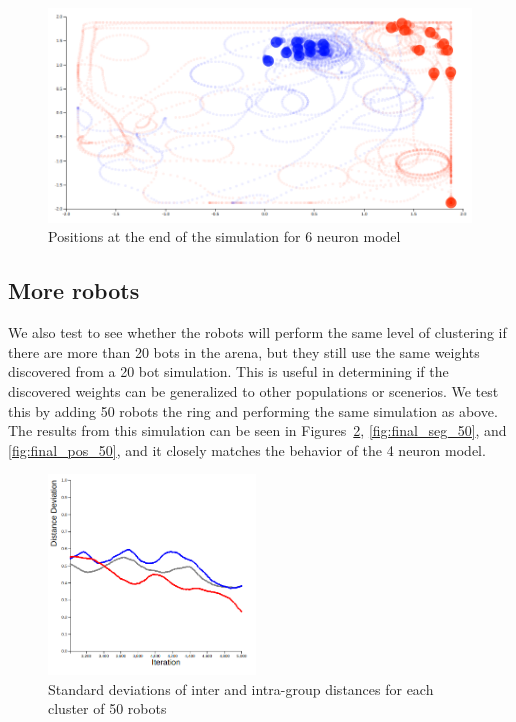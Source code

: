 \begin{figure}
    \centering
    \includegraphics[width=\linewidth]{imgs/final_place_6.png}
    \caption{Positions at the end of the simulation for 6 neuron model}
    \label{fig:final_pos_6}
\end{figure}

\subsection{More robots}
\label{sec:more}

We also test to see whether the robots will perform the same level of clustering if there are more than 20 bots in the arena, but they still use the same weights discovered from a 20 bot simulation. 
This is useful in determining if the discovered weights can be generalized to other populations or scenerios. 
We test this by adding 50 robots the ring and performing the same simulation as above. 
The results from this simulation can be seen in Figures~\ref{fig:final_dev_50}, \ref{fig:final_seg_50}, and \ref{fig:final_pos_50}, and it closely matches the behavior of the 4 neuron model.

\begin{figure}
    \centering
    \includegraphics[width=5.5cm]{imgs/final_dev_50.png}
    \caption{Standard deviations of inter and intra-group distances for each cluster of 50 robots}
    \label{fig:final_dev_50}
\end{figure}

